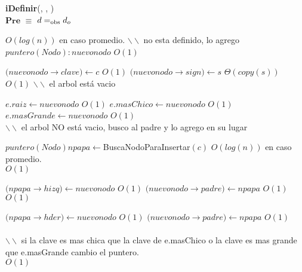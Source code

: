 \begin{algorithm}[H]{\textbf{iDefinir}(, , )}
	{\\ $\textbf{Pre}$ $\equiv$ $d =_{\mathrm{obs}} d_o$}
	\begin{algorithmic}[1]

		 \Comment $O(log(n))$ en caso promedio.
			\State $\backslash\backslash$ no esta definido, lo agrego
			\\
			\State $puntero(Nodo): nuevonodo$ \Comment $O(1)$

			\State $(nuevonodo$$\rightarrow$$clave) \gets c$ \Comment $O(1)$
			\State $(nuevonodo$$\rightarrow$$sign) \gets s$ \Comment $\Theta(copy(s))$
			\\

			 \Comment $O(1)$
				\State $\backslash\backslash$ el arbol está vacio
				
				\State $e.raiz \gets nuevonodo$ \Comment $O(1)$
				\State $e.masChico \gets nuevonodo$ \Comment $O(1)$ 
				\State $e.masGrande \gets nuevonodo$ \Comment $O(1)$
				\\

			\Else
				\State $\backslash\backslash$ el arbol NO está vacio, busco al padre y lo agrego en su lugar

				\State $puntero(Nodo) npapa \gets $BuscaNodoParaInsertar$(c)$ \Comment $O(log(n))$ en caso promedio.
				\\

				 \Comment $O(1)$

					\State $(npapa$$\rightarrow$$hizq) \gets nuevonodo$ \Comment $O(1)$
					\State $(nuevonodo$$\rightarrow$$padre) \gets npapa$ \Comment $O(1)$
					\\
				 \Comment $O(1)$

					\State $(npapa$$\rightarrow$$hder) \gets nuevonodo$ \Comment $O(1)$
					\State $(nuevonodo$$\rightarrow$$padre) \gets npapa$ \Comment $O(1)$
					\\
				\EndIf
				\\

				\State $\backslash\backslash$ si la clave es mas chica que la clave de e.masChico o la clave es mas grande que e.masGrande cambio el puntero.
				\\

				 \Comment $O(1)$


\end{algorithmic}
\end{algorithm}
